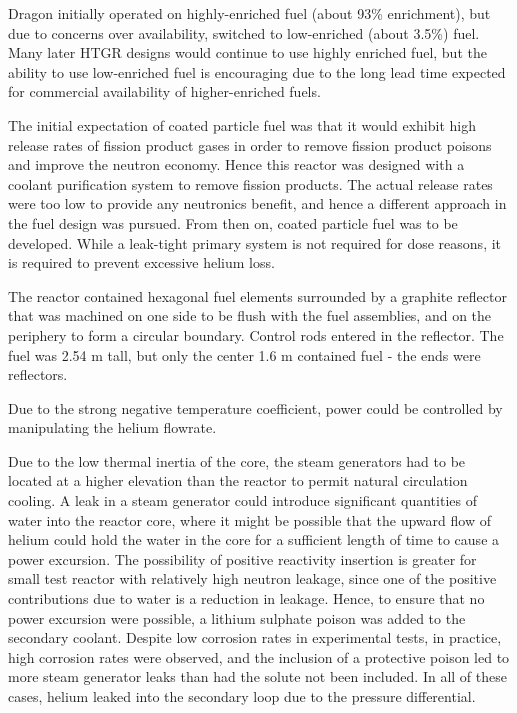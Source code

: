\documentclass[10pt]{article}
\numberwithin{equation}{section} %
\begin{document}
Dragon initially operated on highly-enriched fuel (about 93\% enrichment), but due to concerns over availability, switched to low-enriched (about 3.5\%) fuel. Many later HTGR designs would continue to use highly enriched fuel, but the ability to use low-enriched fuel is encouraging due to the long lead time expected for commercial availability of higher-enriched fuels.

The initial expectation of coated particle fuel was that it would exhibit high release rates of fission product gases in order to remove fission product poisons and improve the neutron economy. Hence this reactor was designed with a coolant purification system to remove fission products. The actual release rates were too low to provide any neutronics benefit, and hence a different approach in the fuel design was pursued. From then on, coated particle fuel was to be developed. While a leak-tight primary system is not required for dose reasons, it is required to prevent excessive helium loss.

The reactor contained hexagonal fuel elements surrounded by a graphite reflector that was machined on one side to be flush with the fuel assemblies, and on the periphery to form a circular boundary. Control rods entered in the reflector. The fuel was 2.54 m tall, but only the center 1.6 m contained fuel - the ends were reflectors.

Due to the strong negative temperature coefficient, power could be controlled by manipulating the helium flowrate. 

Due to the low thermal inertia of the core, the steam generators had to be located at a higher elevation than the reactor to permit natural circulation cooling. A leak in a steam generator could introduce significant quantities of water into the reactor core, where it might be possible that the upward flow of helium could hold the water in the core for a sufficient length of time to cause a power excursion. The possibility of positive reactivity insertion is greater for small test reactor with relatively high neutron leakage, since one of the positive contributions due to water is a reduction in leakage. Hence, to ensure that no power excursion were possible, a lithium sulphate poison was added to the secondary coolant. Despite low corrosion rates in experimental tests, in practice, high corrosion rates were observed, and the inclusion of a protective poison led to more steam generator leaks than had the solute not been included. In all of these cases, helium leaked into the secondary loop due to the pressure differential. 
\end{document}
